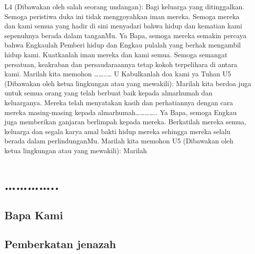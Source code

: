 L4 (Dibawakan oleh salah seorang undangan): Bagi keluarga yang
ditinggalkan. Semoga peristiwa duka ini tidak menggoyahkan iman
mereka. Semoga mereka dan kami semua yang hadir di sini
menyadari bahwa hidup dan kematian kami sepenuhnya berada
dalam tanganMu. Ya Bapa, semoga mereka semakin percaya bahwa
Engkaulah Pemberi hidup dan Engkau pulalah yang berhak
mengambil hidup kami. Kuatkanlah iman mereka dan kami semua.
Semoga semangat persatuan, keakraban dan persaudaraannya tetap
kokoh terpelihara di antara kami. Marilah kita memohon ……..…
U Kabulkanlah doa kami ya Tuhan
U5 (Dibawakan oleh ketua lingkungan atau yang mewakili): Marilah
kita berdoa juga untuk semua orang yang telah berbuat baik kepada
almarhumah dan keluarganya. Mereka telah menyatakan kasih dan
perhatiannya dengan cara mereka masing-masing kepada
almarhumah………….. Ya Bapa, semoga Engkau juga memberikan
ganjaran berlimpah kepada mereka. Berkatilah mereka semua,
keluarga dan segala karya amal bakti hidup mereka sehingga mereka
selalu berada dalam perlindunganMu. Marilah kita memohon
U5 (Dibawakan oleh ketua lingkungan atau yang mewakili): Marilah
\section*{…………..}



\subsection*{Bapa Kami}




\subsection*{Pemberkatan jenazah}